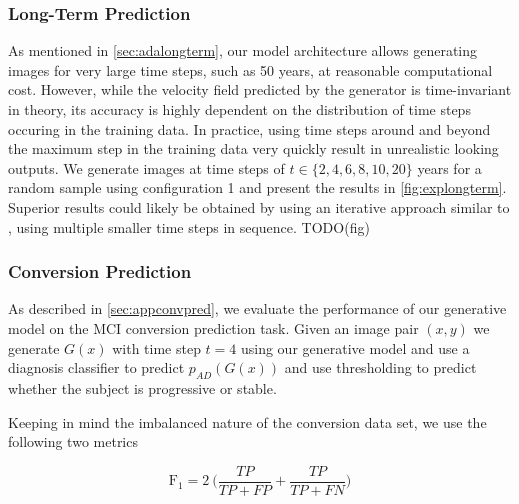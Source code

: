 
\subsubsection*{Long-Term Prediction}
As mentioned in \autoref{sec:adalongterm}, our model architecture allows generating images for very large time steps, such as 50 years, at reasonable computational cost. However, while the velocity field predicted by the generator is time-invariant in theory, its accuracy is highly dependent on the distribution of time steps occuring in the training data. In practice, using time steps around and beyond the maximum step in the training data very quickly result in unrealistic looking outputs. We generate images at time steps of $t \in \{2, 4, 6, 8, 10, 20\}$ years for a random sample using configuration 1 and present the results in \autoref{fig:explongterm}.
Superior results could likely be obtained by using an iterative approach similar to \cite{wegmayr}, using multiple smaller time steps in sequence. TODO(fig)

\subsubsection*{Conversion Prediction}
As described in \autoref{sec:appconvpred}, we evaluate the performance of our generative model on the MCI conversion prediction task. Given an image pair $(x, y)$ we generate $G(x)$ with time step $t = 4$ using our generative model and use a diagnosis classifier to predict $p_{AD}(G(x))$ and use thresholding to predict whether the subject is progressive or stable.

Keeping in mind the imbalanced nature of the conversion data set, we use the following two metrics

\begin{equation}
	\text{F}_1 = 2\ \bigg(\frac{TP}{TP + FP} + \frac{TP}{TP + FN}\bigg)
\end{equation}

